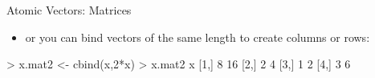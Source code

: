 \documentclass[
  ignorenonframetext,
]{beamer}
\newenvironment{Shaded}{\begin{snugshade}}{\end{snugshade}}
\newcommand{\DecValTok}[1]{\textcolor[rgb]{0.00,0.00,0.81}{#1}}
\newcommand{\FunctionTok}[1]{\textcolor[rgb]{0.00,0.00,0.00}{#1}}
\newcommand{\NormalTok}[1]{#1}
\newcommand{\OtherTok}[1]{\textcolor[rgb]{0.56,0.35,0.01}{#1}}
\newcommand{\SpecialCharTok}[1]{\textcolor[rgb]{0.00,0.00,0.00}{#1}}
\providecommand{\tightlist}{%
  \setlength{\itemsep}{0pt}\setlength{\parskip}{0pt}}
\begin{document}
\begin{frame}[fragile]{Atomic Vectors: Matrices}
\protect\hypertarget{atomic-vectors-matrices-1}{}
\begin{itemize}[<+->]
\tightlist
\item
  or you can bind vectors of the same length to create columns or rows:
\end{itemize}

\begin{Shaded}
\begin{Highlighting}[]
\SpecialCharTok{\textgreater{}}\NormalTok{ x.mat2 }\OtherTok{\textless{}{-}} \FunctionTok{cbind}\NormalTok{(x,}\DecValTok{2}\SpecialCharTok{*}\NormalTok{x)}
\SpecialCharTok{\textgreater{}}\NormalTok{ x.mat2}
\NormalTok{     x   }
\NormalTok{[}\DecValTok{1}\NormalTok{,] }\DecValTok{8} \DecValTok{16}
\NormalTok{[}\DecValTok{2}\NormalTok{,] }\DecValTok{2}  \DecValTok{4}
\NormalTok{[}\DecValTok{3}\NormalTok{,] }\DecValTok{1}  \DecValTok{2}
\NormalTok{[}\DecValTok{4}\NormalTok{,] }\DecValTok{3}  \DecValTok{6}
\end{Highlighting}
\end{Shaded}
\end{frame}
\end{document}
